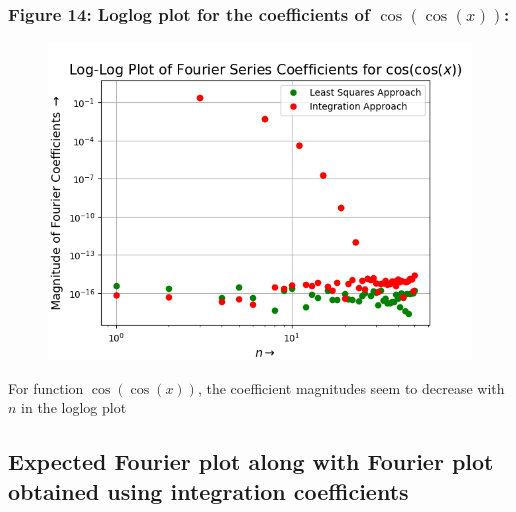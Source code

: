 \documentclass[12pt, a4paper]{article}
\begin{document}
\subsubsection{Figure 14: Loglog plot for the coefficients of $\cos(\cos(x))$:}
\vspace*{-0.5cm}
\begin{figure}[H]
    \centering
    \includegraphics[scale = 0.75]{Figure_14.png}
    \label{fig:sample}
\end{figure}
\vspace*{-0.5cm}
\begin{center}
    For function $\cos(\cos(x))$, the coefficient magnitudes seem to decrease with $n$ in the loglog plot
\end{center}

\subsection{Expected Fourier plot along with Fourier plot obtained using integration coefficients}
\end{document}
